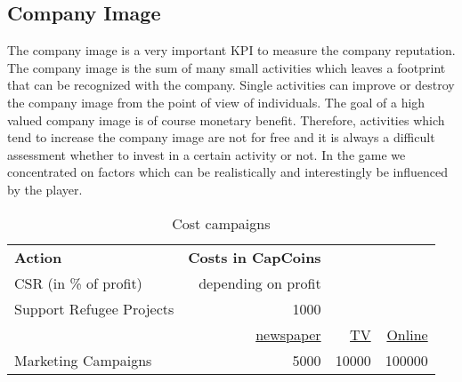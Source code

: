 \subsection{Company Image} \label{company_image}

The company image is a very important KPI to measure the company reputation. The company image is the sum of many small activities which leaves a footprint that can be recognized with the company. Single activities can improve or destroy the company image from the point of view of individuals. The goal of a high valued company image is of course monetary benefit. Therefore, activities which tend to increase the company image are not for free and it is always a difficult assessment whether to invest in a certain activity or not. In the game we concentrated on factors which can be realistically and interestingly be influenced by the player.

\begin{table}[]
\centering
\begin{tabular}{|l|r|r|r|}
\hline
\multicolumn{1}{|l|}{\textbf{Action}} & \multicolumn{1}{l}{\textbf{Costs in CapCoins}} & \multicolumn{1}{l}{} & \multicolumn{1}{l|}{} \\
CSR (in \% of profit)     & depending on profit &                   & \\
Support Refugee Projects  & 1000        &                   & \\
  & \underline{newspaper} & \underline{TV}      &  \underline{Online} \\
Marketing Campaigns       & 5000                & 10000             & 100000 \\
\hline
\end{tabular}
\caption{Cost campaigns}
\label{cost_campaigns}
\end{table}

